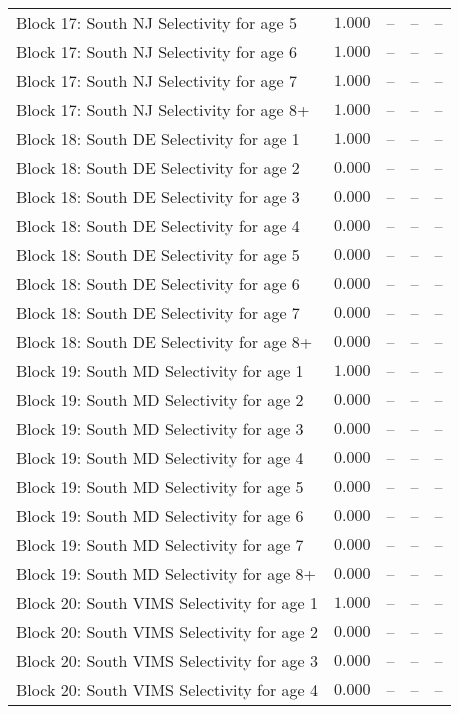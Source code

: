 \documentclass[
]{article}
\begin{document}
\begin{landscape}
\begin{longtable}[t]{lrrrr}
Block 17: South NJ Selectivity for age 5 & $1.000$ & -- & -- & --\\
Block 17: South NJ Selectivity for age 6 & $1.000$ & -- & -- & --\\
\addlinespace
Block 17: South NJ Selectivity for age 7 & $1.000$ & -- & -- & --\\
Block 17: South NJ Selectivity for age 8+ & $1.000$ & -- & -- & --\\
Block 18: South DE Selectivity for age 1 & $1.000$ & -- & -- & --\\
Block 18: South DE Selectivity for age 2 & $0.000$ & -- & -- & --\\
Block 18: South DE Selectivity for age 3 & $0.000$ & -- & -- & --\\
\addlinespace
Block 18: South DE Selectivity for age 4 & $0.000$ & -- & -- & --\\
Block 18: South DE Selectivity for age 5 & $0.000$ & -- & -- & --\\
Block 18: South DE Selectivity for age 6 & $0.000$ & -- & -- & --\\
Block 18: South DE Selectivity for age 7 & $0.000$ & -- & -- & --\\
Block 18: South DE Selectivity for age 8+ & $0.000$ & -- & -- & --\\
\addlinespace
Block 19: South MD Selectivity for age 1 & $1.000$ & -- & -- & --\\
Block 19: South MD Selectivity for age 2 & $0.000$ & -- & -- & --\\
Block 19: South MD Selectivity for age 3 & $0.000$ & -- & -- & --\\
Block 19: South MD Selectivity for age 4 & $0.000$ & -- & -- & --\\
Block 19: South MD Selectivity for age 5 & $0.000$ & -- & -- & --\\
\addlinespace
Block 19: South MD Selectivity for age 6 & $0.000$ & -- & -- & --\\
Block 19: South MD Selectivity for age 7 & $0.000$ & -- & -- & --\\
Block 19: South MD Selectivity for age 8+ & $0.000$ & -- & -- & --\\
Block 20: South VIMS Selectivity for age 1 & $1.000$ & -- & -- & --\\
Block 20: South VIMS Selectivity for age 2 & $0.000$ & -- & -- & --\\
\addlinespace
Block 20: South VIMS Selectivity for age 3 & $0.000$ & -- & -- & --\\
Block 20: South VIMS Selectivity for age 4 & $0.000$ & -- & -- & --\\

\end{longtable}
\end{landscape}
\end{document}

